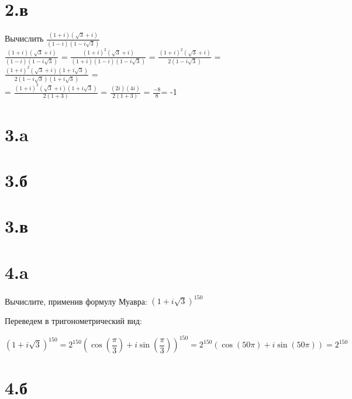 \documentclass[a4paper]{article}
\begin{document}
\section*{2.в}
Вычислить  $\frac{(1 +i)(\sqrt{3} + i)}{(1 - i)(1 - i\sqrt{3})}$\\
$\frac{(1 +i)(\sqrt{3} + i)}{(1 - i)(1 - i\sqrt{3})}$ = $\frac{(1 +i)^2(\sqrt{3} + i)}{(1 +i)(1 - i)(1 - i\sqrt{3})}$ = $\frac{(1 +i)^2(\sqrt{3} + i)}{2(1 - i\sqrt{3})}$ =
 $\frac{(1 +i)^2(\sqrt{3} + i)(1 + i  \sqrt{3})}{2(1 - i\sqrt{3})(1 + i \sqrt{3})}$  =\\
 =  $\frac{(1 +i)^2(\sqrt{3} + i)(1 + i  \sqrt{3})}{2(1 + 3)}$  =   $\frac{(2i)(4i)}{2(1 + 3)}$  = $\frac{-8}{8} $= -1






\section*{3.a}

\section*{3.б}

\section*{3.в}
\section*{4.a}
Вычислите, применив формулу Муавра: $(1 + i \sqrt{3})^{150}$

Переведем в тригонометрический вид:

$$(1 + i \sqrt{3})^{150} = 2^{150}(\cos(\frac{\pi}{3}) + i\sin(\frac{\pi}{3}))^{150} = 2^{150}(\cos(50\pi) + i\sin(50\pi)) = 2^{150}$$


\section*{4.б}
\end{document}
